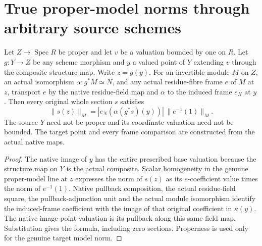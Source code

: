 \section{True proper-model norms through arbitrary source schemes}

\begin{theorem}\label{thm:proper-model-norm-framed-source}
\leanok
Let $Z\to\operatorname{Spec}R$ be proper and let $v$ be a valuation
bounded by one on $R$. Let $g:Y\to Z$ be any scheme morphism and
$y$ a valued point of $Y$ extending $v$ through the composite structure
map. Write $z=g(y)$. For an invertible module $M$ on $Z$, an actual
isomorphism $\alpha:g^*M\simeq N$, and any actual residue-fibre
frame $e$ of $M$ at $z$, transport $e$ by the native residue-field
map and $\alpha$ to the induced frame $e_N$ at $y$. Then every
original whole section $s$ satisfies
\[
 \|s(z)\|_M=|e_N(\alpha(g^*s)(y))|\,\|e^{-1}(1)\|_M.
\]
The source $Y$ need not be proper and its coordinate valuation need
not be bounded. The target point and every frame comparison are
constructed from the actual native maps.
\end{theorem}
\begin{proof}
The native image of $y$ has the entire prescribed base valuation
because the structure map on $Y$ is the actual composite. Scalar
homogeneity in the genuine proper-model line at $z$ expresses the
norm of $s(z)$ as its $e$-coefficient value times the norm of
$e^{-1}(1)$. Native pullback composition, the actual residue-field
square, the pullback-adjunction unit and the actual module
isomorphism identify the induced-frame coefficient with the image
of that original coefficient in $\kappa(y)$. The native image-point
valuation is its pullback along this same field map. Substitution
gives the formula, including zero sections. Properness is used only
for the genuine target model norm.
\end{proof}

